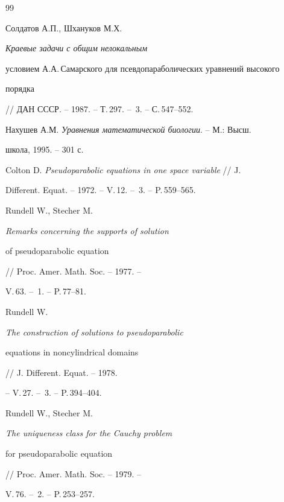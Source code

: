 \begin{thebibliography}{99} 


 




Солдатов А.П., Шхануков М.Х. {\em Краевые задачи с общим нелокальным 


условием А.А.\,Самарского для псевдопараболических уравнений высокого 


порядка} // ДАН СССР. -- 1987. -- Т.\,297. -- \No\,3. -- С.\,547--552. 


 




Нахушев А.М. {\em Уравнения математической биологии}. -- М.: Высш. 


школа, 1995. -- 301 с. 


 




Colton D. {\em Pseudoparabolic equations in one space variable} // J. 


Different. Equat. -- 1972. -- V.\,12. -- \No\,3. -- P.\,559--565. 


 




Rundell W., Stecher M. {\em Remarks concerning the supports of solution 


of pseudoparabolic equation} // Proc. Amer. Math. Soc. -- 1977. -- 


V.\,63. -- \No\,1. -- P.\,77--81. 


 




Rundell W. {\em The construction of solutions to pseudoparabolic 


equations in noncylindrical domains} // J. Different. Equat. -- 1978. 


-- V.\,27. -- \No\,3. -- P.\,394--404. 


 




Rundell W., Stecher M. {\em The uniqueness class for the Cauchy problem 


for pseudoparabolic equation} // Proc. Amer. Math. Soc. -- 1979. -- 


V.\,76. -- \No\,2. -- P.\,253--257. 



\end{thebibliography}
